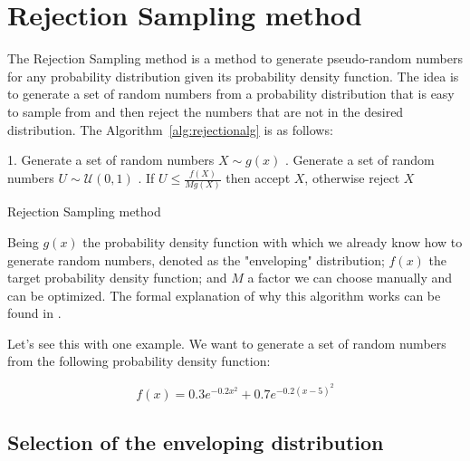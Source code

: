 \documentclass{report}
\begin{document}
\section{Rejection Sampling method}
\label{sec:rejection_sampling}

The Rejection Sampling method is a method to generate pseudo-random numbers for any probability distribution given its probability density function. The idea is to generate a set of random numbers from a probability distribution that is easy to sample from and then reject the numbers that are not in the desired distribution. The Algorithm~\ref{alg:rejectionalg} is as follows:

\begin{center}
	\begin{minipage}{0.7\linewidth} %
		\begin{algorithm}[H]
			1. Generate a set of random numbers \(X \sim g(x)\) . Generate a set of random numbers \(U \sim \mathcal{U}(0,1)\) . If \(U \leq \frac{f(X)}{Mg(X)}\) then accept \(X\), otherwise reject \(X\) \;
			\caption{Rejection Sampling method} %
			\label{alg:rejectionalg}   %
		\end{algorithm}
	\end{minipage}
\end{center}

Being \(g(x)\) the probability density function with which we already know how to generate random numbers, denoted as the "enveloping" distribution; \(f(x)\) the target probability density function; and \(M\) a factor we can choose manually and can be optimized. The formal explanation of why this algorithm works can be found in \cite{peng2023rejectionsampling}.

Let's see this with one example. We want to generate a set of random numbers from the following probability density function: 

\begin{equation} \label{eq:bimodal} f(x) = 0.3e^{-0.2x^2}+0.7e^{-0.2(x-5)^2} \end{equation}

\subsection{Selection of the enveloping distribution}
\label{sec:enveloping_distribution}
\end{document}
